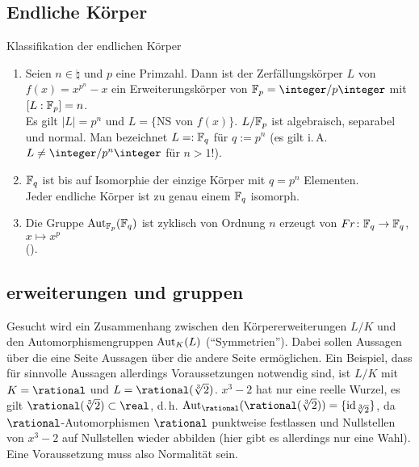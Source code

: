 \subsection{%
    Endliche Körper%
}

\begin{Theorem}{Klassifikation der endlichen Körper}
    \begin{enumerate}[label=(\alph*)]
        \item
        Seien $n \in \natural$ und $p$ eine Primzahl.
        Dann ist der Zerfällungskörper $L$ von $f(x) = x^{p^n} - x$
        ein Erweiterungskörper von $\F_p = \integer/p\integer$ mit
        $[L:\mathbb{F}_p] = n$.\\
        Es gilt $|L| = p^n$ und $L = \{\text{NS von } f(x)\}$.
        $L/\mathbb{F}_p$ ist algebraisch, separabel und normal.
        Man bezeichnet $L =: \mathbb{F}_q$ für $q := p^n$
        (es gilt i.\,A. $L \not= \integer/p^n\integer$ für $n > 1$!).
        
        \item
        $\mathbb{F}_q$ ist bis auf Isomorphie der einzige Körper mit $q = p^n$
        Elementen.\\
        Jeder endliche Körper ist zu genau einem $\mathbb{F}_q$ isomorph.
        
        \item
        Die Gruppe $\operatorname{Aut}_{\mathbb{F}_p}(\mathbb{F}_q)$ ist zyklisch von Ordnung $n$
        erzeugt von $Fr\colon \mathbb{F}_q \rightarrow \mathbb{F}_q$, $x \mapsto x^p$\\
        ().
    \end{enumerate}
\end{Theorem}

\subsection{%
    erweiterungen und gruppen%
}

\begin{Bem}
    Gesucht wird ein Zusammenhang zwischen den Körpererweiterungen $L/K$
    und den Automorphismengruppen $\operatorname{Aut}_K(L)$ ("`Symmetrien"').
    Dabei sollen Aussagen über die eine Seite Aussagen über die andere
    Seite ermöglichen.
    Ein Beispiel, dass für sinnvolle Aussagen allerdings Voraussetzungen
    notwendig sind,
    ist $L/K$ mit $K = \rational$ und $L = \rational(\sqrt[3]{2})$.
    $x^3 - 2$ hat nur eine reelle Wurzel, es gilt
    $\rational(\sqrt[3]{2}) \subset \real$, d.\,h.
    $\Aut_\rational(\rational(\sqrt[3]{2})) = \{\id_{\sqrt[3]{2}}\}$,
    da $\rational$-Automorphismen $\rational$ punktweise festlassen und
    Nullstellen von $x^3 - 2$ auf Nullstellen wieder abbilden
    (hier gibt es allerdings nur eine Wahl).
    Eine Voraussetzung muss also Normalität sein.
\end{Bem}

